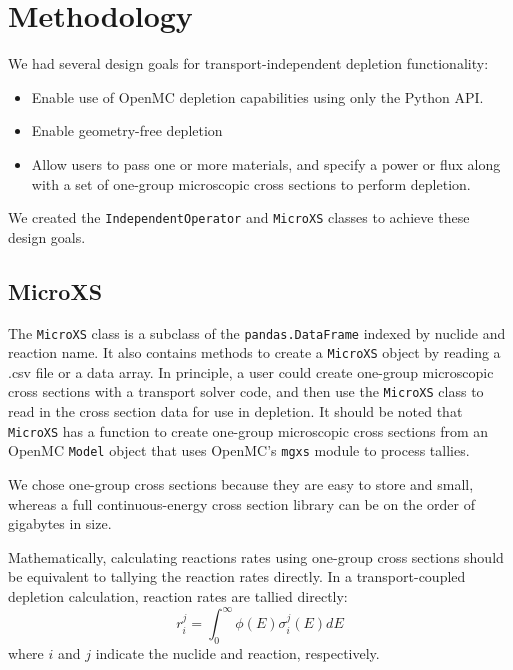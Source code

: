 \section{Methodology}
    \label{sec:methods}
    We had several design goals for transport-independent depletion functionality:
    \begin{itemize}
        \item Enable use of OpenMC depletion capabilities using only the Python API.
        \item Enable geometry-free depletion
        \item Allow users to pass one or more materials, and specify a power or
            flux along with a set of one-group microscopic cross sections to
            perform depletion.
    \end{itemize}
    
    We created the \verb.IndependentOperator. and \verb.MicroXS. classes to
    achieve these design goals.
    
    \subsection{MicroXS}
        The \verb.MicroXS. class is a subclass of the \verb,pandas.DataFrame,
        indexed by nuclide and reaction name. It also contains methods to create
        a \verb.MicroXS. object by reading a .csv file or a data array. In
        principle, a user could create one-group microscopic cross sections with
        a transport solver code, and then use the \verb.MicroXS. class to read in the
        cross section data for use in depletion. It should be noted that
        \verb.MicroXS. has a function to create one-group microscopic cross
        sections from an OpenMC \verb.Model. object that uses OpenMC's
        \verb.mgxs. module to process tallies.

        We chose one-group cross sections because they are easy to store and
        small, whereas a full continuous-energy cross section library can be on
        the order of gigabytes in size.
        
        Mathematically, calculating reactions rates using one-group cross
        sections should be equivalent to tallying the reaction rates directly.
        In a transport-coupled depletion calculation, reaction rates are tallied
        directly:
        \begin{equation}
            r^j_i = \int_0^\infty \phi(E) \sigma^j_i(E) dE
        \end{equation}
        where $i$ and $j$ indicate the nuclide and reaction, respectively.

